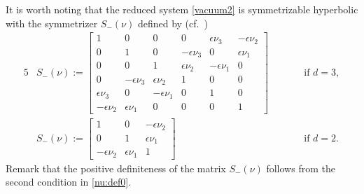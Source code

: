 \documentclass[twoside,11pt]{article}
\numberwithin{equation}{section}
\begin{document}
	It is worth noting that the reduced system \eqref{vacuum2} is symmetrizable hyperbolic with the symmetrizer $S_-(\nu) $ defined by (cf.~\cite[\S 2]{T12MR2974767})
	\begin{alignat}{5}
		&S_-(\nu):=\begin{bmatrix}
			1& 0 &0 &0 & \epsilon \nu_3 & -\epsilon \nu_2\\
			0& 1 &0  & -\epsilon \nu_3  &0 & \epsilon \nu_1\\
			0& 0 &1  & \epsilon \nu_2  &-\epsilon \nu_1 &0\\						
			0 & -\epsilon \nu_3 & \epsilon \nu_2 &1& 0 &0 \\
			\epsilon \nu_3 & 0& -\epsilon \nu_1 &0& 1 &0 \\		
			-\epsilon \nu_2 & \epsilon \nu_1& 0 &0& 0 &1		
		\end{bmatrix}&& \qquad \textrm{if }d=3,
		\label{S-3D}
\\[2mm]
	&S_-(\nu):=\begin{bmatrix}
		1 & 0 & -\epsilon \nu_2\\
		0 & 1& \epsilon \nu_1\\
		-\epsilon \nu_2 & \epsilon \nu_1 & 1
	\end{bmatrix}
&&\qquad \textrm{if }d=2.
	\label{S-2D}
\end{alignat}	
Remark that  the positive definiteness of the matrix $S_-(\nu)$ follows from the second condition in
\eqref{nu:def0}.
	
	
\end{document}
